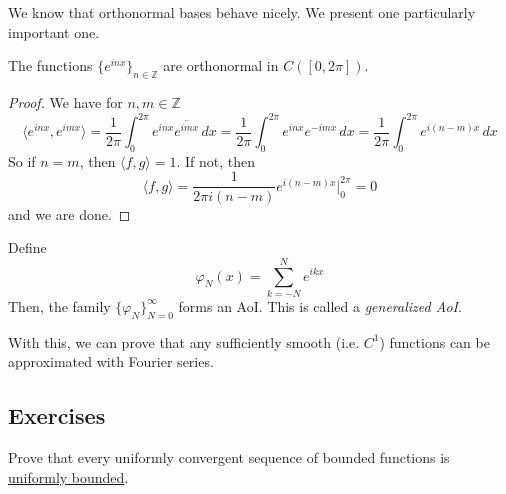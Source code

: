  We know that orthonormal bases behave nicely. We present one particularly important one. 

  \begin{lemma}
    \label{thm:functions-orthonormal}
 
    The functions $\{e^{inx}\}_{n \in \mathbb{Z}}$ are orthonormal in $C([0, 2\pi])$.
  \end{lemma} 
  \begin{proof}
    We have for $n, m \in \mathbb{Z}$
    \begin{equation}
      \langle e^{inx}, e^{imx} \rangle = \frac{1}{2\pi} \int_0^{2\pi} e^{inx} \overline{e^{imx}} \,dx = \frac{1}{2\pi} \int_0^{2\pi} e^{inx} e^{-imx} \,dx = \frac{1}{2\pi} \int_0^{2\pi} e^{i(n-m) x} \,dx
    \end{equation}
    So if $n = m$, then $\langle f, g \rangle = 1$. If not, then 
    \begin{equation}
      \langle f, g \rangle = \frac{1}{2 \pi i (n - m)} e^{i (n - m) x} \bigg|_0^{2\pi} = 0 
    \end{equation}
    and we are done. 
  \end{proof}

  \begin{lemma}
    \label{thm:generalized-aoi}
    Define 
    \begin{equation}
      \varphi_N (x) = \sum_{k = -N}^{N} e^{i k x}
    \end{equation}
    Then, the family $\{\varphi_N\}_{N = 0}^\infty$ forms an AoI. This is called a \textit{generalized AoI}. 
  \end{lemma}

  With this, we can prove that any sufficiently smooth (i.e. $C^1$) functions can be approximated with Fourier series. 

\subsection{Exercises} 

  \begin{exercise}[Rudin 7.1]
    Prove that every uniformly convergent sequence of bounded functions is \hyperref[def:uniformly-bounded]{uniformly bounded}.
  \end{exercise}
  \begin{solution}

  \end{solution}

